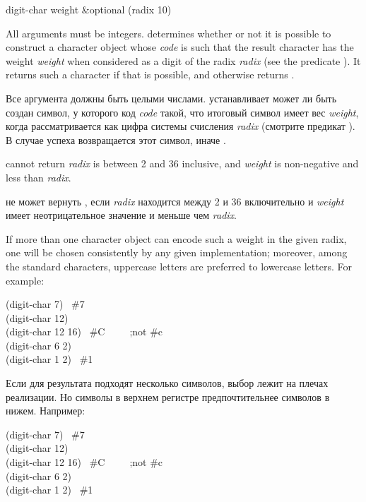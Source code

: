 \begin{defun}[Function]
digit-char weight &optional (radix 10)

All arguments must be integers.  
determines whether or not it is possible to construct
a character object whose \emph{code} is such that the
result character has the weight \emph{weight} when considered as
a digit of the radix \emph{radix} (see the predicate ).
It returns such a character if that is possible, and otherwise returns {\false}.

Все аргумента должны быть целыми числами.  устанавливает может
ли быть создан символ, у которого код \emph{code} такой, что итоговый символ
имеет вес \emph{weight}, когда рассматривается как цифра системы счисления
\emph{radix} (смотрите предикат ).
В случае успеха возвращается этот символ, иначе {\false}.

 cannot return {\false} \emph{radix} is between 2 and 36
inclusive, and \emph{weight} is non-negative and less than \emph{radix}.

 не может вернуть {\false}, если \emph{radix} находится между 2
и 36 включительно и \emph{weight} имеет неотрицательное значение и меньше чем
\emph{radix}.

If more than one character object can encode
such a weight in the given radix, one will be chosen consistently
by any given implementation; moreover, among the standard characters,
uppercase letters are preferred to lowercase letters.
For example:
\begin{lisp}
(digit-char 7) \EV\ \#{\Xbackslash}7 \\
(digit-char 12) \EV\ {\false} \\
(digit-char 12 16) \EV\ \#{\Xbackslash}C~~~~~;\textrm{not} \#{\Xbackslash}c \\
(digit-char 6 2) \EV\ {\false} \\
(digit-char 1 2) \EV\ \#{\Xbackslash}1
\end{lisp}

Если для результата подходят несколько символов, выбор лежит на плечах
реализации. Но символы в верхнем регистре предпочтительнее символов в нижем.
Например:
\begin{lisp}
(digit-char 7) \EV\ \#{\Xbackslash}7 \\
(digit-char 12) \EV\ {\false} \\
(digit-char 12 16) \EV\ \#{\Xbackslash}C~~~~~;\textrm{not} \#{\Xbackslash}c \\
(digit-char 6 2) \EV\ {\false} \\
(digit-char 1 2) \EV\ \#{\Xbackslash}1
\end{lisp}
\end{defun}

